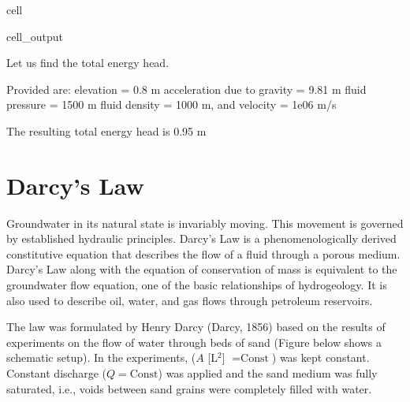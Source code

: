 \documentclass[letterpaper,10pt,english]{jupyterBook}
\let\sphinxpxdimen\pdfpxdimen\else\newdimen\sphinxpxdimen
\begin{document}
\begin{sphinxuseclass}{cell}
\begin{sphinxVerbatimOutput}
\begin{sphinxuseclass}{cell_output}
\begin{sphinxVerbatim}[commandchars=\\\{\}]
Let us find the total energy head.

Provided are:
elevation = 0.8 m
acceleration due to gravity = 9.81 m
fluid pressure = 1500 m
fluid density = 1000 m, and
velocity = 1e\PYGZhy{}06 m/s 

The resulting total energy head is 0.95 m
\end{sphinxVerbatim}

\end{sphinxuseclass}\end{sphinxVerbatimOutput}

\end{sphinxuseclass}

\section{Darcy’s Law}
\label{\detokenize{content/flow/L4/14_darcy_law_K:darcy-s-law}}
\sphinxAtStartPar
Groundwater in its natural state is invariably moving. This movement is governed by
established hydraulic principles. Darcy’s Law is a phenomenologically derived
constitutive equation that describes the flow of a fluid through a porous medium.
Darcy’s Law along with the equation of conservation of mass is equivalent to the
groundwater flow equation, one of the basic relationships of hydrogeology. It is also
used to describe oil, water, and gas flows through petroleum reservoirs.

\sphinxAtStartPar
The law was formulated by Henry Darcy (Darcy, 1856) based on the results of experiments on the flow
of water through beds of sand (Figure below shows a schematic setup). In the experiments,   (\(A\) {[}L\(^2\){]} \(= \text{Const}\)) was kept constant. Constant discharge (\(Q= \text{Const}\)) was applied and the sand medium was fully saturated, i.e., voids between sand grains were completely filled with water.

\noindent{\hspace*{\fill}\sphinxincludegraphics[height=400\sphinxpxdimen]{{L4_f3}.png}\hspace*{\fill}}
\end{document}
